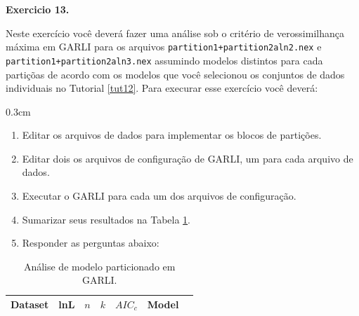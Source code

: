 \begin{refsection}
\begin{blackBlock}{\textbf{Exercicio 13.}}\label{tut13:ex:13.3}

Neste exercício você deverá fazer uma análise sob o critério de verossimilhança máxima em GARLI para os arquivos \texttt{partition1+partition2aln2.nex} e \texttt{partition1+partition2aln3.nex} assumindo modelos distintos para cada partiçõas de acordo com os modelos que você selecionou os conjuntos de dados individuais  no Tutorial \ref{tut12}. Para execurar esse exercício você deverá:

\end{blackBlock}


\begin {myindentpar}{0.3cm}
\begin{enumerate}[\itshape 1.]

	\item{Editar os arquivos de dados para implementar os blocos de partições.}
	\item{Editar dois os arquivos de configuração de GARLI, um para cada arquivo de dados.}
	\item{Executar o GARLI para cada um dos arquivos de configuração.}
	\item{Sumarizar seus resultados na Tabela \ref{tut13:ex:13.3}.}
	\item{Responder as perguntas abaixo:}

\end{enumerate}
\end{myindentpar}


\pagestyle{fancy}
\begin{center}

\begin{longtable}{|l|>{\centering}m{2cm}|>{\centering}m{1cm}|c|>{\centering}m{2cm}|>{\centering}m{2cm} |@{}m{0pt}@{}}
\caption[Análise de modelo particionado em GARLI.]{Análise de modelo particionado em GARLI.} \label{tut13:ex:13.3} \\

\hline\hline  \multicolumn{1}{|c|}{\textbf{Dataset}} & \textbf{lnL}  & \textbf{$n$} & \textbf{$k$} & \textbf{$AIC_{c}$} & \textbf{Model} &\\
\endfirsthead


\end{longtable}
\end{center}
\end{refsection}
